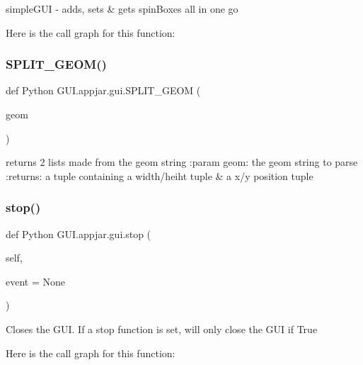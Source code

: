 \begin{DoxyVerb}
\begin{DoxyVerb}simpleGUI - adds, sets & gets spinBoxes all in one go \end{DoxyVerb}
 Here is the call graph for this function\+:
\mbox{\label{class_python_01_g_u_i_1_1appjar_1_1gui_a41b2873cd7755bdab3a946e5b1b555b4}} 
\subsubsection{\texorpdfstring{S\+P\+L\+I\+T\+\_\+\+G\+E\+O\+M()}{SPLIT\_GEOM()}}
{\footnotesize\ttfamily def Python G\+U\+I.\+appjar.\+gui.\+S\+P\+L\+I\+T\+\_\+\+G\+E\+OM (\begin{DoxyParamCaption}\item[{}]{geom }\end{DoxyParamCaption})\hspace{0.3cm}{\ttfamily [static]}}

\begin{DoxyVerb}returns 2 lists made from the geom string
:param geom: the geom string to parse
:returns: a tuple containing a width/heiht tuple & a x/y position tuple
\end{DoxyVerb}
 \mbox{\label{class_python_01_g_u_i_1_1appjar_1_1gui_a09fd0d3197efd74785125a04344eac6d}} 
\subsubsection{\texorpdfstring{stop()}{stop()}}
{\footnotesize\ttfamily def Python G\+U\+I.\+appjar.\+gui.\+stop (\begin{DoxyParamCaption}\item[{}]{self,  }\item[{}]{event = {\ttfamily None} }\end{DoxyParamCaption})}

\begin{DoxyVerb}Closes the GUI. If a stop function is set, will only close the GUI if True \end{DoxyVerb}
 Here is the call graph for this function\+:
\mbox{\label{class_python_01_g_u_i_1_1appjar_1_1gui_a53e86304a35d41e135f8449ad83a3640}} 

\end{DoxyVerb}
